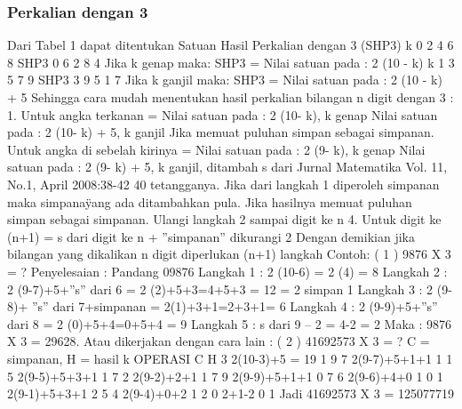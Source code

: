\subsubsection {Perkalian dengan 3}
Dari Tabel 1 dapat ditentukan
Satuan Hasil Perkalian dengan 3 (SHP3)
k 0 2 4 6 8
SHP3 0 6 2 8 4
Jika k genap maka:
SHP3 = Nilai satuan pada : 2 (10 - k)
k 1 3 5 7 9
SHP3 3 9 5 1 7
Jika k ganjil maka:
SHP3 = Nilai satuan pada : 2 (10 - k) + 5
Sehingga cara mudah menentukan hasil
perkalian bilangan n digit dengan 3 :
1. Untuk angka terkanan =
Nilai satuan pada : 2 (10- k), k genap
Nilai satuan pada : 2 (10- k) + 5,
k ganjil
Jika memuat puluhan simpan sebagai
\”simpanan. Untuk angka di sebelah kirinya =
Nilai satuan pada : 2 (9- k), k genap
Nilai satuan pada : 2 (9- k) + 5,
k ganjil, ditambah \”s\” dari
Jurnal Matematika Vol. 11, No.1, April 2008:38-42
40
tetangganya.
Jika dari langkah 1 diperoleh
\“simpanan\” maka \“simpana\" yang ada
ditambahkan pula.
Jika hasilnya memuat puluhan simpan
sebagai \”simpanan. Ulangi langkah 2 sampai digit ke n
4. Untuk digit ke (n+1) =
\”s\” dari digit ke n + ”simpanan”
dikurangi 2
Dengan demikian jika bilangan yang
dikalikan n digit diperlukan (n+1) langkah
Contoh:
( 1 ) 9876 X 3 = ?
Penyelesaian : Pandang 09876
Langkah 1 : 2 (10-6) = 2 (4) = 8
Langkah 2 : 2 (9-7)+5+”s” dari 6
= 2 (2)+5+3=4+5+3 = 12
= 2 simpan 1
Langkah 3 : 2 (9-8)+
”s” dari 7+\”simpanan\”
= 2(1)+3+1=2+3+1= 6
Langkah 4 : 2 (9-9)+5+”s” dari 8
= 2 (0)+5+4=0+5+4 = 9
Langkah 5 : \“s\” dari 9 – 2 = 4-2 = 2
Maka : 9876 X 3 = 29628.
Atau dikerjakan dengan cara lain :
( 2 ) 41692573 X 3 = ?
C = \”simpanan\”, H = hasil
k OPERASI C H
3 2(10-3)+5 = 19 1 9
7 2(9-7)+5+1+1 1 1
5 2(9-5)+5+3+1 1 7
2 2(9-2)+2+1 1 7
9 2(9-9)+5+1+1 0 7
6 2(9-6)+4+0 1 0
1 2(9-1)+5+3+1 2 5
4 2(9-4)+0+2 1 2
0 2+1-2 0 1
Jadi 41692573 X 3 = 125077719

